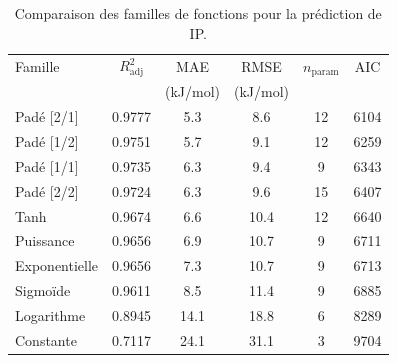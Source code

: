 \begin{table}[htbp]
\centering
\footnotesize
\caption{Comparaison des familles de fonctions pour la prédiction de IP.}
\label{tab:s4_ip_families}
\begin{tabular}{lccccc}
\toprule
Famille & $R^2_{\mathrm{adj}}$ & MAE & RMSE & $n_{\mathrm{param}}$ & AIC \\
 & & (kJ/mol) & (kJ/mol) & & \\
\midrule
Padé [2/1] & 0.9777 & 5.3 & 8.6 & 12 & 6104 \\
Padé [1/2] & 0.9751 & 5.7 & 9.1 & 12 & 6259 \\
Padé [1/1] & 0.9735 & 6.3 & 9.4 & 9 & 6343 \\
Padé [2/2] & 0.9724 & 6.3 & 9.6 & 15 & 6407 \\
Tanh & 0.9674 & 6.6 & 10.4 & 12 & 6640 \\
Puissance & 0.9656 & 6.9 & 10.7 & 9 & 6711 \\
Exponentielle & 0.9656 & 7.3 & 10.7 & 9 & 6713 \\
Sigmoïde & 0.9611 & 8.5 & 11.4 & 9 & 6885 \\
Logarithme & 0.8945 & 14.1 & 18.8 & 6 & 8289 \\
Constante & 0.7117 & 24.1 & 31.1 & 3 & 9704 \\
\bottomrule
\end{tabular}
\end{table}